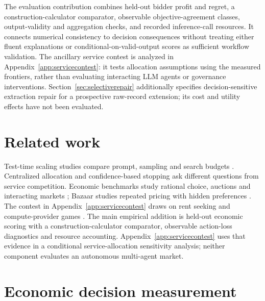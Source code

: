 \documentclass[sigconf,anonymous,nonacm]{acmart}
\begin{document}
The evaluation contribution combines held-out bidder profit and regret, a construction-calculator comparator, observable objective-agreement classes, output-validity and aggregation checks, and recorded inference-call resources. It connects numerical consistency to decision consequences without treating either fluent explanations or conditional-on-valid-output scores as sufficient workflow validation. The ancillary service contest is analyzed in Appendix~\ref{app:servicecontest}: it tests allocation assumptions using the measured frontiers, rather than evaluating interacting LLM agents or governance interventions.
Section~\ref{sec:selectiverepair} additionally specifies decision-sensitive extraction repair for a prospective raw-record extension; its cost and utility effects have not been evaluated.
\section{Related work}
Test-time scaling studies compare prompt, sampling and search budgets \citep{wei2022chain,snell2024scaling,wu2024inference,alomrani2025budget}. Centralized allocation \citep{wan2026shadowprice} and confidence-based stopping \citep{jurayj2025finalanswer} ask different questions from service competition. Economic benchmarks study rational choice, auctions and interacting markets \citep{fish2025econevals,chen2024aucarena,zhu2024synthetic}; Bazaar studies repeated pricing with hidden preferences \citep{ahmed2026bazaar}. The contest in Appendix~\ref{app:servicecontest} draws on rent seeking \citep{tullock1980efficient} and compute-provider games \citep{artola2026games}.
The main empirical addition is held-out economic scoring with a construction-calculator comparator, observable action-loss diagnostics and resource accounting. Appendix~\ref{app:servicecontest} uses that evidence in a conditional service-allocation sensitivity analysis; neither component evaluates an autonomous multi-agent market.
\section{Economic decision measurement}
\label{sec:framework}
\end{document}
